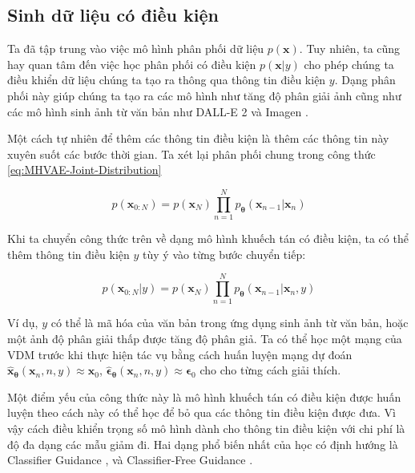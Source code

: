 \documentclass[14pt, a4paper]{article}
\numberwithin{equation}{section}
\numberwithin{figure}{section}
\numberwithin{dl}{section}
\numberwithin{md}{section}
\numberwithin{bd}{section}
\numberwithin{dn}{section}
\numberwithin{hq}{section}
\begin{document}
    \subsection{Sinh dữ liệu có điều kiện}

    Ta đã tập trung vào việc mô hình phân phối dữ liệu $p(\boldsymbol{x})$.
    Tuy nhiên, ta cũng hay quan tâm đến việc học phân phối có điều kiện $p(\boldsymbol{x} \vert y)$ cho phép chúng ta điều khiển dữ liệu chúng ta tạo ra thông qua thông tin điều kiện $y$.
    Dạng phân phối này giúp chúng ta tạo ra các mô hình như tăng độ phân giải ảnh \cite{ho2022cascaded} cũng như các mô hình sinh ảnh từ văn bản như DALL-E 2 \cite{ramesh2022hierarchical} và Imagen \cite{saharia2021image}.

    Một cách tự nhiên để thêm các thông tin điều kiện là thêm các thông tin này xuyên suốt các bước thời gian.
    Ta xét lại phân phối chung trong công thức \ref{eq:MHVAE-Joint-Distribution}

    \begin{equation*}
        p(\boldsymbol{x}_{0:N}) = p(\boldsymbol{x}_N) \prod_{n=1}^N p_{\boldsymbol{\theta}} (\boldsymbol{x}_{n-1} \vert \boldsymbol{x}_n)
    \end{equation*}

    Khi ta chuyển công thức trên về dạng mô hình khuếch tán có điều kiện, ta có thể thêm thông tin điều kiện $y$ tùy ý vào từng bước chuyển tiếp:

    \begin{equation}
        p(\boldsymbol{x}_{0:N} \vert y) = p(\boldsymbol{x}_N) \prod_{n=1}^N p_{\boldsymbol{\theta}} (\boldsymbol{x}_{n-1} \vert \boldsymbol{x}_n, y)
    \end{equation}

    Ví dụ, $y$ có thể là mã hóa của văn bản trong ứng dụng sinh ảnh từ văn bản, hoặc một ảnh độ phân giải thấp được tăng độ phân giả.
    Ta có thể học một mạng của VDM trước khi thực hiện tác vụ bằng cách huấn luyện mạng dự đoán $\hat{\boldsymbol{x}}_{\boldsymbol{\theta}} (\boldsymbol{x}_n, n, y) \approx \boldsymbol{x}_0$, $\hat{\boldsymbol{\epsilon}}_{\boldsymbol{\theta}} (\boldsymbol{x}_n, n, y) \approx \boldsymbol{\epsilon}_0$ cho cho từng cách giải thích.

    Một điểm yếu của công thức này là mô hình khuếch tán có điều kiện được huấn luyện theo cách này có thể học để bỏ qua các thông tin điều kiện được đưa.
    Vì vậy cách điều khiển trọng số mô hình dành cho thông tin điều kiện với chi phí là độ đa dạng các mẫu giảm đi.
    Hai dạng phổ biến nhất của học có định hướng là Classifier Guidance \cite{song2020score}, \cite{dhariwal2021diffusion} và Classifier-Free Guidance \cite{ho2021classifier}.
\end{document}
